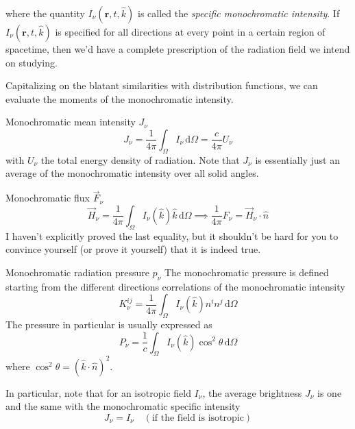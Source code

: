where the quantity $I_{\nu}(\textbf{r}, t, \textbf{$\hat{k}$})$ is called the \emph{specific monochromatic intensity}. If $I_{\nu}(\textbf{r}, t, \textbf{$\hat{k}$})$ is specified for all directions at every point in a certain region of spacetime, then we'd have a complete prescription of the radiation field we intend on studying.
\par Capitalizing on the blatant similarities with distribution functions, we can evaluate the moments of the monochromatic intensity.
\begin{definition}{Monochromatic mean intensity $J_{\nu}$}
	\begin{equation*}
		J_{\nu} = \frac{1}{4\pi} \int_{\Omega} I_{\nu}\, \text{d}\Omega = \frac{c}{4\pi} U_{\nu}
	\end{equation*}
	with $U_{\nu}$ the total energy density of radiation.
	Note that $J_{\nu}$ is essentially just an average of the monochromatic intensity over all solid angles.
\end{definition}
\begin{definition}{Monochromatic flux $\vec{F}_{\nu}$}
	\begin{equation*}
		\vec{H}_{\nu} = \frac{1}{4\pi} \int_{\Omega} I_{\nu}(\textbf{$\hat{k}$})\textbf{$\hat{k}$}\, \text{d}\Omega \implies  \frac{1}{4\pi} F_{\nu} = \vec{H}_{\nu}\cdot \hat{n}
	\end{equation*}
	I haven't explicitly proved the last equality, but it shouldn't be hard for you to convince yourself (or prove it yourself) that it is indeed true.
\end{definition}
\begin{definition}{Monochromatic radiation pressure $p_{\nu}$}
	The monochromatic pressure is defined starting from the different directions correlations of the monochromatic intensity 
	\begin{equation*}
		K_{\nu}^{ij} = \frac{1}{4\pi} \int_{\Omega} I_{\nu}(\textbf{$\hat{k}$})\textbf{$n^{i}$}\textbf{$n^{j}$}\, \text{d}\Omega 
	\end{equation*}
	The pressure in particular is usually expressed as
	\begin{equation*}
		P_{\nu} = \frac{1}{c} \int_{\Omega} I_{\nu}(\textbf{$\hat{k}$}) \cos^{2}\theta\,\text{d}\Omega
	\end{equation*}
	where $\cos^{2}\theta = (\textbf{$\hat{k}$} \cdot \textbf{$\hat{n}$})^{2}$.
\end{definition}
In particular, note that for an isotropic field $I_{\nu}$, the average brightness $J_{\nu}$ is one and the same with the monochromatic specific intensity
\begin{equation*}
    J_{\nu} = I_{\nu} \quad (\text{if the field is isotropic})
\end{equation*}

